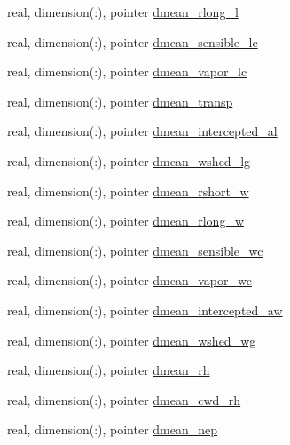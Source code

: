 \begin{DoxyCompactItemize}
\item 
real, dimension(\+:), pointer \hyperlink{structed__state__vars_1_1edtype_ae828b728ce08e4834529ed3c3a07c999}{dmean\+\_\+rlong\+\_\+l}
\item 
real, dimension(\+:), pointer \hyperlink{structed__state__vars_1_1edtype_a628acad76df94a989a6c93d448aa34ee}{dmean\+\_\+sensible\+\_\+lc}
\item 
real, dimension(\+:), pointer \hyperlink{structed__state__vars_1_1edtype_ae6ccc7ae24a7aaab00298b95c8ac55b5}{dmean\+\_\+vapor\+\_\+lc}
\item 
real, dimension(\+:), pointer \hyperlink{structed__state__vars_1_1edtype_aed70055aa8aca3c15e83da2731a20ccf}{dmean\+\_\+transp}
\item 
real, dimension(\+:), pointer \hyperlink{structed__state__vars_1_1edtype_a75b6b2e9f27c71af5d93d00112c51a8c}{dmean\+\_\+intercepted\+\_\+al}
\item 
real, dimension(\+:), pointer \hyperlink{structed__state__vars_1_1edtype_a80a6933011a5c5c457346a32fca8276d}{dmean\+\_\+wshed\+\_\+lg}
\item 
real, dimension(\+:), pointer \hyperlink{structed__state__vars_1_1edtype_a4230494bf9d51b7cf11214574babb358}{dmean\+\_\+rshort\+\_\+w}
\item 
real, dimension(\+:), pointer \hyperlink{structed__state__vars_1_1edtype_a1f9864cec008533822b4461e35b63d70}{dmean\+\_\+rlong\+\_\+w}
\item 
real, dimension(\+:), pointer \hyperlink{structed__state__vars_1_1edtype_a3d627b2c203e6447e22eba32bd6b028e}{dmean\+\_\+sensible\+\_\+wc}
\item 
real, dimension(\+:), pointer \hyperlink{structed__state__vars_1_1edtype_acb49cd59e9b2204230c2d3d46eda8b69}{dmean\+\_\+vapor\+\_\+wc}
\item 
real, dimension(\+:), pointer \hyperlink{structed__state__vars_1_1edtype_ac2860e74b1e36b01a8e0bd99af79429e}{dmean\+\_\+intercepted\+\_\+aw}
\item 
real, dimension(\+:), pointer \hyperlink{structed__state__vars_1_1edtype_a4d8e36999fbc015c2be8ca419b861721}{dmean\+\_\+wshed\+\_\+wg}
\item 
real, dimension(\+:), pointer \hyperlink{structed__state__vars_1_1edtype_af4dc345685389dd535f2eae728a5a244}{dmean\+\_\+rh}
\item 
real, dimension(\+:), pointer \hyperlink{structed__state__vars_1_1edtype_ab76107ffdcfca9e38cd69a12eb051bc2}{dmean\+\_\+cwd\+\_\+rh}
\item 
real, dimension(\+:), pointer \hyperlink{structed__state__vars_1_1edtype_ab17a87442f7017a2ee0f0169573ef1ef}{dmean\+\_\+nep}

\end{DoxyCompactItemize}
